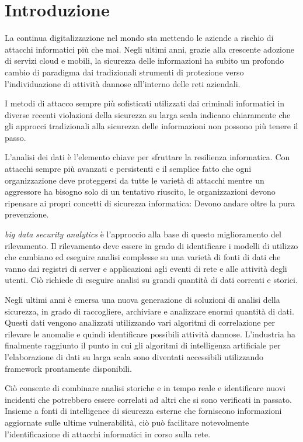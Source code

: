\documentclass[../main.tex]{subfiles}
\begin{document}
\chapter{Introduzione}

La continua digitalizzazione nel mondo sta mettendo le aziende a rischio di attacchi informatici più che mai. Negli ultimi anni, grazie alla crescente adozione di servizi cloud e mobili, la sicurezza delle informazioni ha subito un profondo cambio di paradigma dai tradizionali strumenti di protezione verso l'individuazione di attività dannose all'interno delle reti aziendali.

I metodi di attacco sempre più sofisticati utilizzati dai criminali informatici in diverse recenti violazioni della sicurezza su larga scala indicano chiaramente che gli approcci tradizionali alla sicurezza delle informazioni non possono più tenere il passo. 

L'analisi dei dati è l'elemento chiave per sfruttare la resilienza informatica. Con attacchi sempre più avanzati e persistenti e il semplice fatto che ogni organizzazione deve proteggersi da tutte le varietà di attacchi mentre un aggressore ha bisogno solo di un tentativo riuscito, le organizzazioni devono ripensare ai propri concetti di sicurezza informatica: Devono andare oltre la pura prevenzione. 

\textit{big data security analytics} è l'approccio alla base di questo miglioramento del rilevamento. Il rilevamento deve essere in grado di identificare i modelli di utilizzo che cambiano ed eseguire analisi complesse su una varietà di fonti di dati che vanno dai registri di server e applicazioni agli eventi di rete e alle attività degli utenti.
Ciò richiede di eseguire analisi su grandi quantità di dati correnti e storici.

Negli ultimi anni è emersa una nuova generazione di soluzioni di analisi della sicurezza, in grado di raccogliere, archiviare e analizzare enormi quantità di dati. Questi dati vengono analizzati utilizzando vari algoritmi di correlazione per rilevare le anomalie e quindi identificare possibili attività dannose.
L'industria ha finalmente raggiunto il punto in cui gli algoritmi di intelligenza artificiale per l'elaborazione di dati su larga scala sono diventati accessibili utilizzando framework prontamente disponibili.

Ciò consente di combinare analisi storiche e in tempo reale e identificare nuovi incidenti che potrebbero essere correlati ad altri che si sono verificati in passato. Insieme a fonti di intelligence di sicurezza esterne che forniscono informazioni aggiornate sulle ultime vulnerabilità, ciò può facilitare notevolmente l'identificazione di attacchi informatici in corso sulla rete. \newline
\end{document}
